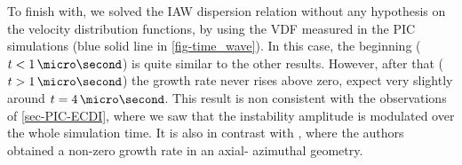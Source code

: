   
  To finish with, we solved the \ac{IAW} dispersion relation without any hypothesis on the velocity distribution functions, by using the VDF measured in the PIC simulations (blue solid line in  \cref{fig-time_wave}).
  In this case, the beginning ($t < 1 \,\micro\second$) is quite similar to the other results.
  However, after that ($t > 1 \,\micro\second$) the growth rate never rises above zero, expect very slightly around $t=4\,\micro\second$.
  This result is non consistent with the observations of \cref{sec-PIC-ECDI}, where we saw that the instability amplitude is modulated over the whole simulation time.
  It is also in contrast with \citet{lafleur2018}, where the authors obtained a non-zero growth rate in an axial- azimuthal geometry.
  
  
  
  
  \FloatBarrier
